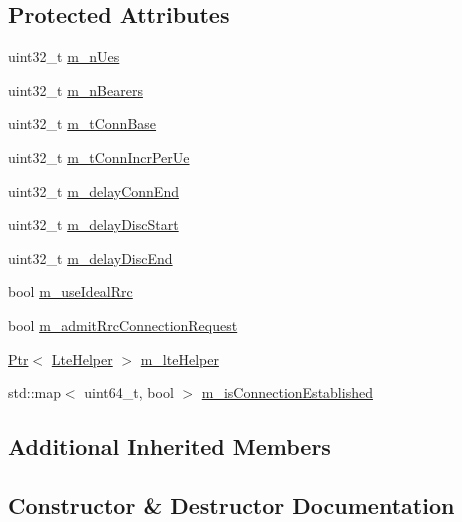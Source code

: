 \subsection*{Protected Attributes}
\begin{DoxyCompactItemize}
\item 
uint32\+\_\+t \hyperlink{classLteRrcConnectionEstablishmentTestCase_a402354f3bb0e71f08f711f4f27cd8fd4}{m\+\_\+n\+Ues}
\item 
uint32\+\_\+t \hyperlink{classLteRrcConnectionEstablishmentTestCase_aed8d1feb0c1b557cd6685b17f3fa39f9}{m\+\_\+n\+Bearers}
\item 
uint32\+\_\+t \hyperlink{classLteRrcConnectionEstablishmentTestCase_a8212fdb7a75ab8630edd67f7561e5964}{m\+\_\+t\+Conn\+Base}
\item 
uint32\+\_\+t \hyperlink{classLteRrcConnectionEstablishmentTestCase_ac842741be5d5027a4df127c620548ee7}{m\+\_\+t\+Conn\+Incr\+Per\+Ue}
\item 
uint32\+\_\+t \hyperlink{classLteRrcConnectionEstablishmentTestCase_a771ecf605e8f8cdf7a32d7d822946364}{m\+\_\+delay\+Conn\+End}
\item 
uint32\+\_\+t \hyperlink{classLteRrcConnectionEstablishmentTestCase_ac6182c550ef96e540079572673417262}{m\+\_\+delay\+Disc\+Start}
\item 
uint32\+\_\+t \hyperlink{classLteRrcConnectionEstablishmentTestCase_acf9e0e4fe98974cc1139311de09064d2}{m\+\_\+delay\+Disc\+End}
\item 
bool \hyperlink{classLteRrcConnectionEstablishmentTestCase_a631ad66c06ee736fee379d5eddd16589}{m\+\_\+use\+Ideal\+Rrc}
\item 
bool \hyperlink{classLteRrcConnectionEstablishmentTestCase_a2e3935f73414ffa68b957ee7f83eb8e2}{m\+\_\+admit\+Rrc\+Connection\+Request}
\item 
\hyperlink{classns3_1_1Ptr}{Ptr}$<$ \hyperlink{classns3_1_1LteHelper}{Lte\+Helper} $>$ \hyperlink{classLteRrcConnectionEstablishmentTestCase_a8b3adef98e6fbb2d1a88c98aba524a4e}{m\+\_\+lte\+Helper}
\item 
std\+::map$<$ uint64\+\_\+t, bool $>$ \hyperlink{classLteRrcConnectionEstablishmentTestCase_a1516a2a155242462521febbc223b6cfb}{m\+\_\+is\+Connection\+Established}
\end{DoxyCompactItemize}
\subsection*{Additional Inherited Members}


\subsection{Constructor \& Destructor Documentation}
